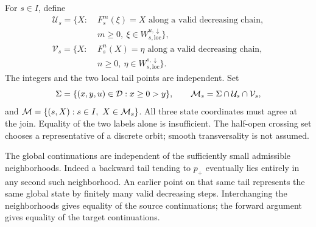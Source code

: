 \begin{definition}\label{def:matching}
For \(s\in I\), define
\begin{align*}
 \mathcal U_s=\{X:\;&F_s^m(\xi)=X\text{ along a valid decreasing chain},\\
 &m\ge0,\ \xi\in W^{u,\downarrow}_{s,\mathrm{loc}}\},\\
 \mathcal V_s=\{X:\;&F_s^n(X)=\eta\text{ along a valid decreasing chain},\\
 &n\ge0,\ \eta\in W^{s,\downarrow}_{s,\mathrm{loc}}\}.
\end{align*}
The integers and the two local tail points are independent. Set
\begin{equation}\label{eq:matching}
 \Sigma=\{(x,y,u)\in\mathcal D:x\ge0>y\},\qquad
 \mathcal M_s=\Sigma\cap\mathcal U_s\cap\mathcal V_s,
\end{equation}
and \(\mathcal M=\{(s,X):s\in I,\ X\in\mathcal M_s\}\).
All three state coordinates must agree at the join. Equality of the two
labels alone is insufficient. The half-open crossing set chooses a
representative of a discrete orbit; smooth transversality is not assumed.
\end{definition}

The global continuations are independent of the sufficiently small admissible
neighborhoods. Indeed a backward tail tending to \(p_+\) eventually lies
entirely in any second such neighborhood. An earlier point on that same tail
represents the same global state by finitely many valid decreasing steps.
Interchanging the neighborhoods gives equality of the source continuations;
the forward argument gives equality of the target continuations.

